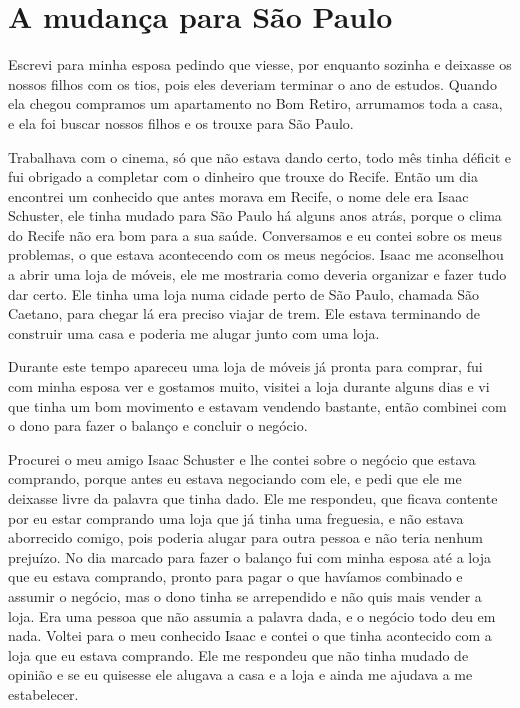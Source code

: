 \chapter{A mudança para São Paulo}

Escrevi para minha esposa pedindo que viesse, por enquanto sozinha e
deixasse os nossos filhos com os tios, pois eles deveriam terminar o ano
de estudos. Quando ela chegou compramos um apartamento no Bom Retiro,
arrumamos toda a casa, e ela foi buscar nossos filhos e os trouxe para
São Paulo.

Trabalhava com o cinema, só que não estava dando certo, todo mês tinha
déficit e fui obrigado a completar com o dinheiro que trouxe do Recife.
Então um dia encontrei um conhecido que antes morava em Recife, o nome
dele era Isaac Schuster, ele tinha mudado para São Paulo há alguns anos
atrás, porque o clima do Recife não era bom para a sua saúde.
Conversamos e eu contei sobre os meus problemas, o que estava
acontecendo com os meus negócios. Isaac me aconselhou a abrir uma loja
de móveis, ele me mostraria como deveria organizar e fazer tudo dar
certo. Ele tinha uma loja numa cidade perto de São Paulo, chamada São
Caetano, para chegar lá era preciso viajar de trem. Ele estava
terminando de construir uma casa e poderia me alugar junto com uma loja.

Durante este tempo apareceu uma loja de móveis já pronta para comprar,
fui com minha esposa ver e gostamos muito, visitei a loja durante alguns
dias e vi que tinha um bom movimento e estavam vendendo bastante, então
combinei com o dono para fazer o balanço e concluir o negócio.

Procurei o meu amigo Isaac Schuster e lhe contei sobre o negócio que
estava comprando, porque antes eu estava negociando com ele, e pedi que
ele me deixasse livre da palavra que tinha dado. Ele me respondeu, que
ficava contente por eu estar comprando uma loja que já tinha uma
freguesia, e não estava aborrecido comigo, pois poderia alugar para
outra pessoa e não teria nenhum prejuízo. No dia marcado para fazer o
balanço fui com minha esposa até a loja que eu estava comprando, pronto
para pagar o que havíamos combinado e assumir o negócio, mas o dono
tinha se arrependido e não quis mais vender a loja. Era uma pessoa que
não assumia a palavra dada, e o negócio todo deu em nada. Voltei para o
meu conhecido Isaac e contei o que tinha acontecido com a loja que eu
estava comprando. Ele me respondeu que não tinha mudado de opinião e se
eu quisesse ele alugava a casa e a loja e ainda me ajudava a me
estabelecer.

